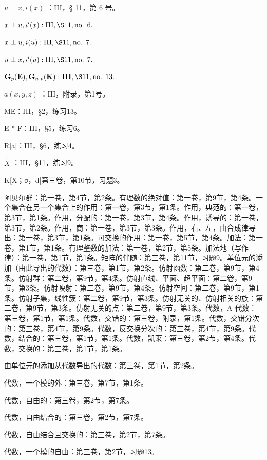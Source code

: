 \(u \perp x, i(x)\) ：III，§ 11，第 6 号。

\(x \perp u, i'(x): \text{III}, \S 11, \text{no. } 6.\)

\(x \perp u, i(u): \text{III}, \S 11, \text{no. } 7.\)

\(u \perp x, i'(u): \text{III}, \S 11, \text{no. } 7.\)

\(\mathbf{G}_p(\mathbf{E}), \mathbf{G}_{n,p}(\mathbf{K}) : \mathbf{III}, \S 11, \text{no. } 13.\)

\(a(x,y,z)\) ：III，附录，第1号。

ME：III，§2，练习13。

E * F：III，§5，练习6。

R{[}a{]}：III，§6，练习4。

\(\tilde{X}\) ：III，§11，练习9。

K{[}X；σ，d{]}第三卷，第10节，习题3。


阿贝尔群：第一卷，第4节，第2条。有理数的绝对值：第一卷，第9节，第4条。一个集合在另一个集合上的作用：第一卷，第3节，第1条。作用，典范的：第一卷，第3节，第1条。作用，分配的：第一卷，第3节，第4条。作用，诱导的：第一卷，第3节，第2条。作用，商：第一卷，第3节，第3条。作用，右、左，由合成律导出：第一卷，第3节，第1条。可交换的作用：第一卷，第5节，第4条。加法：第一卷，第1节，第1条。有理整数的加法：第一卷，第2节，第5条。加法地（写作律）：第一卷，第1节，第1条。矩阵的伴随：第三卷，第11节，习题9。单位元的添加（由此导出的代数）：第三卷，第1节，第2条。仿射函数：第二卷，第9节，第4条。仿射群：第二卷，第9节，第4条。仿射直线、平面、超平面：第二卷，第9节，第3条。仿射映射：第二卷，第9节，第4条。仿射空间：第二卷，第9节，第1条。仿射子集，线性簇：第二卷，第9节，第3条。仿射无关的、仿射相关的族：第二卷，第9节，第3条。仿射无关的点：第二卷，第9节，第3条。代数，A-代数：第三卷，第1节，第1条。代数，交错的：第三卷，附录，第1条。代数，交错分次的：第三卷，第4节，第9条。代数，反交换分次的：第三卷，第4节，第9条。代数，结合的：第三卷，第1节，第1条。代数，凯莱：第三卷，第2节，第4条。代数，交换的：第三卷，第1节，第1条。

由单位元的添加从代数导出的代数：第三卷，第1节，第2条。

代数，一个模的外：第三卷，第7节，第1条。

代数，自由的：第三卷，第2节，第7条。

代数，自由结合的：第三卷，第2节，第7条。

代数，自由结合且交换的：第三卷，第2节，第7条。

代数，一个模的自由：第三卷，第2节，习题13。

